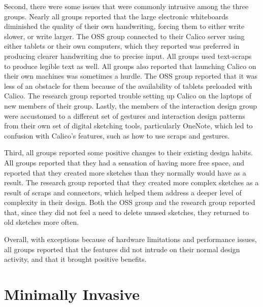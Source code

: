 Second, there were some issues that were commonly intrusive among the three groups. Nearly all groups reported that the large electronic whiteboards diminished the quality of their own handwriting, forcing them to either write slower, or write larger. The OSS group connected to their Calico server using either tablets or their own computers, which they reported was preferred in producing clearer handwriting due to precise input. All groups used text-scraps to produce legible text as well. All groups also reported that launching Calico on their own machines was sometimes a hurdle. The OSS group reported that it was less of an obstacle for them because of the availability of tablets preloaded with Calico. The research group reported trouble setting up Calico on the laptops of new members of their group. Lastly, the members of the interaction design group were accustomed to a different set of gestures and interaction design patterns from their own set of digital sketching tools, particularly OneNote, which led to confusion with Calico's features, such as how to use scraps and gestures.


Third, all groups reported some positive changes to their existing design habits. All groups reported that they had a sensation of having more free space, and reported that they created more sketches than they normally would have as a result. The research group reported that they created more complex sketches as a result of scraps and connectors, which helped them address a deeper level of complexity in their design. Both the OSS group and the research group reported that, since they did not feel a need to delete unused sketches, they returned to old sketches more often.



Overall, with exceptions because of hardware limitations and performance issues, all groups reported that the features did not intrude on their normal design activity, and that it brought positive benefits. 

\section{Minimally Invasive}
\label{chapter:discussion:minimally-invasive}

